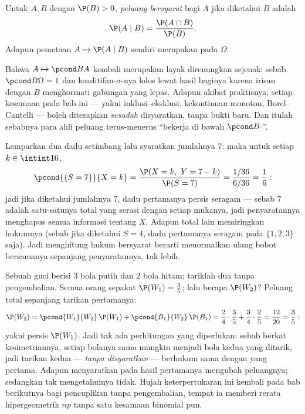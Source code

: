 \begin{definition}\label{def:b2:proba:conditional}
Untuk  $A, B$ dengan $\P(B) > 0$, \emph{peluang
bersyarat} bagi $A$ jika diketahui $B$ adalah
\[
\P(A \mid B) = \frac{\P(A \cap B)}{\P(B)} .
\]
Adapun pemetaan $A \mapsto \P(A \mid B)$ sendiri merupakan 
pada $\Omega$.
\end{definition}

\begin{remark}
Bahwa $A \mapsto \pcond BA$ kembali merupakan 
layak direnungkan sejenak: sebab $\pcond B\Omega = 1$ dan keaditifan-$\sigma$-nya
lolos lewat hasil baginya karena irisan dengan $B$
menghormati gabungan yang lepas. Adapun akibat praktisnya: setiap
kesamaan pada bab ini --- yakni inklusi--eksklusi, kekontinuan
monoton, Borel--Cantelli --- boleh diterapkan \emph{sesudah}
disyaratkan, tanpa bukti baru. Dan itulah sebabnya para ahli peluang terus-menerus
``bekerja di bawah $\pcond B{\cdot}$''.
\end{remark}

\begin{example}\label{ex:b2:proba:sumseven}
Lemparkan dua dadu setimbang lalu syaratkan jumlahnya $7$: maka untuk
setiap $k \in \intint16$,
\[
\pcond{\{S = 7\}}{X = k}
= \frac{\P(X = k,\ Y = 7 - k)}{\P(S = 7)}
= \frac{1/36}{6/36} = \frac16 :
\]
jadi jika diketahui jumlahnya $7$, dadu pertamanya persis seragam ---
sebab $7$ adalah satu-satunya total yang serasi dengan setiap mukanya, jadi
penyaratannya menghapus semua informasi tentang $X$. Adapun total lain
memiringkan hukumnya (sebab jika diketahui $S = 4$, dadu pertamanya seragam
pada $\{1, 2, 3\}$ saja). Jadi menghitung hukum bersyarat berarti
menormalkan ulang bobot bersamanya sepanjang  penyaratannya,
tak lebih.
\end{example}

\begin{example}\label{ex:b2:proba:seconddraw}
Sebuah guci berisi $3$ bola putih dan $2$ bola hitam; tariklah dua tanpa
pengembalian. Semua orang sepakat $\P(W_1) = \frac35$; lalu berapa
$\P(W_2)$? Peluang total sepanjang tarikan pertamanya:
\[
\P(W_2) = \pcond{W_1}{W_2}\,\P(W_1) +
\pcond{B_1}{W_2}\,\P(B_1)
= \frac24\cdot\frac35 + \frac34\cdot\frac25
= \frac{12}{20} = \frac35 :
\]
yakni persis $\P(W_1)$. Jadi tak ada perhitungan yang diperlukan: sebab berkat kesimetriannya,
setiap bolanya sama mungkin menjadi bola kedua yang ditarik, jadi
tarikan kedua --- \emph{tanpa disyaratkan} --- berhukum sama
dengan yang pertama. Adapun menyaratkan pada hasil pertamanya mengubah
peluangnya; sedangkan tak mengetahuinya tidak. Hujah keterpertukaran
ini kembali pada bab berikutnya bagi pencuplikan tanpa
pengembalian, tempat ia memberi rerata hipergeometrik $np$
tanpa satu kesamaan binomial pun.
\end{example}


